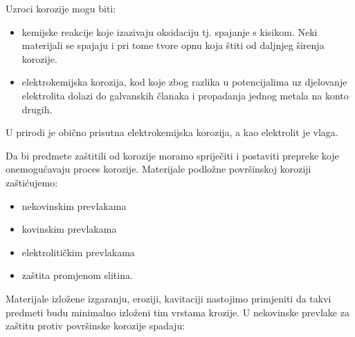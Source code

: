 \documentclass[a4paper,12pt]{article}
\numberwithin{figure}{section}
\begin{document}
Uzroci korozije mogu biti:
\begin{itemize}
\item kemijske reakcije koje izazivaju oksidaciju tj. spajanje s kisikom. Neki materijali se spajaju i pri tome tvore opnu koja štiti od daljnjeg širenja korozije. 
\item elektrokemijska korozija, kod koje zbog razlika u potencijalima uz djelovanje elektrolita dolazi do galvanskih članaka i propadanja jednog metala na konto drugih.
\end{itemize}
U prirodi je obično prisutna elektrokemijska korozija, a kao elektrolit je vlaga. \par
Da bi predmete zaštitili od korozije moramo spriječiti i postaviti prepreke koje onemogućavaju proces korozije. Materijale podložne površinskoj koroziji zaštićujemo:
\begin{itemize}
\item nekovinskim prevlakama
\item kovinskim prevlakama
\item elektrolitičkim prevlakama
\item zaštita promjenom slitina.
\end{itemize} 
Materijale izložene izgaranju, eroziji, kavitaciji nastojimo primjeniti da takvi predmeti budu minimalno izloženi tim vrstama krozije. U nekovinske prevlake za zaštitu protiv površinske korozije spadaju:
\end{document}
